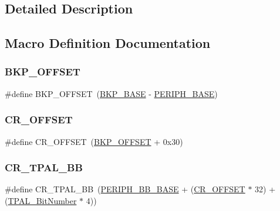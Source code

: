 \subsection{Detailed Description}


\subsection{Macro Definition Documentation}
\mbox{\label{group___b_k_p___private___defines_gaaaf71f474657e7c0c5b0d6ba9697cf5d}} 
\subsubsection{\texorpdfstring{BKP\_OFFSET}{BKP\_OFFSET}}
{\footnotesize\ttfamily \#define B\+K\+P\+\_\+\+O\+F\+F\+S\+ET~(\mbox{\hyperlink{group___peripheral__memory__map_gaa15d5a9f40794105397ba5ea567c4ae1}{B\+K\+P\+\_\+\+B\+A\+SE}} -\/ \mbox{\hyperlink{group___peripheral__memory__map_ga9171f49478fa86d932f89e78e73b88b0}{P\+E\+R\+I\+P\+H\+\_\+\+B\+A\+SE}})}

\mbox{\label{group___b_k_p___private___defines_gafa1d3d0ea72132df651c76fc1bdffffc}} 
\subsubsection{\texorpdfstring{CR\_OFFSET}{CR\_OFFSET}}
{\footnotesize\ttfamily \#define C\+R\+\_\+\+O\+F\+F\+S\+ET~(\mbox{\hyperlink{group___b_k_p___private___defines_gaaaf71f474657e7c0c5b0d6ba9697cf5d}{B\+K\+P\+\_\+\+O\+F\+F\+S\+ET}} + 0x30)}

\mbox{\label{group___b_k_p___private___defines_gaa36e52f37b9fa6982bd224a6dcb86f78}} 
\subsubsection{\texorpdfstring{CR\_TPAL\_BB}{CR\_TPAL\_BB}}
{\footnotesize\ttfamily \#define C\+R\+\_\+\+T\+P\+A\+L\+\_\+\+BB~(\mbox{\hyperlink{group___peripheral__memory__map_gaed7efc100877000845c236ccdc9e144a}{P\+E\+R\+I\+P\+H\+\_\+\+B\+B\+\_\+\+B\+A\+SE}} + (\mbox{\hyperlink{group___r_c_c___private___defines_gafa1d3d0ea72132df651c76fc1bdffffc}{C\+R\+\_\+\+O\+F\+F\+S\+ET}} $\ast$ 32) + (\mbox{\hyperlink{group___b_k_p___private___defines_ga4af1869d665b8804104b6754c787820a}{T\+P\+A\+L\+\_\+\+Bit\+Number}} $\ast$ 4))}

